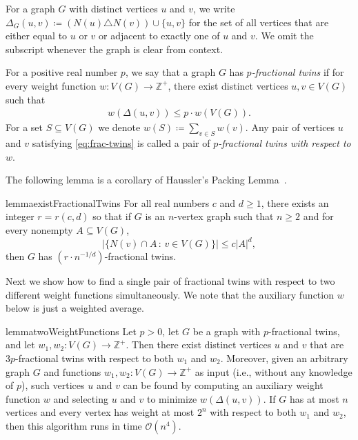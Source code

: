 \documentclass[11pt]{article}
\theoremstyle{definition}
\newcommand{\RMM}[1]{\begin{RMMin}#1\end{RMMin}}
\newcommand{\inAppendix}{$\clubsuit$}%
\renewcommand{\leq}{\leqslant}
\renewcommand{\geq}{\geqslant}
\renewcommand{\subset}{\subseteq}
\newcommand{\set}[1]{\{#1\}}
\begin{document}
For a graph $G$ with distinct vertices $u$ and $v$, we write $\Delta_G(u,v)\coloneqq (N(u)\triangle N(v))\cup\set{u,v}$ for the set of all vertices that are either equal to $u$ or $v$ or adjacent to exactly one of $u$ and $v$. 
We omit the subscript whenever the graph is clear from context.

For a positive real number $p$, we say that a graph $G$ has \emph{$p$-fractional twins} if for every weight function $w:V(G) \rightarrow \mathbb{Z}^+$, there exist distinct vertices $u,v \in V(G)$ such that \begin{align}\label{eq:frac-twins} w\left(\Delta(u,v)\right) \leq p \cdot w(V(G)).\end{align}For a set $S\subset V(G)$ we denote $w(S)\coloneqq \sum_{v \in S}w(v)$. Any  pair of vertices $u$ and $v$ satisfying \eqref{eq:frac-twins}  is called a pair of \emph{$p$-fractional twins with respect to $w$}. 

The following lemma is a corollary of Haussler's Packing Lemma~\cite{Haussler95}.

\begin{restatable}[\inAppendix{}]{lemma}{existFractionalTwins}
\label{lem:existFractionalTwins}
For all real numbers $c$ and $d\geq 1$, there exists an integer $r = r(c,d)$ so that if $G$ is an $n$-vertex graph such that $n\geq 2$ and for every nonempty $A \subseteq V(G)$,
    \[\Big|\set{N(v)\cap A\,:\,v\in V(G)}\Big| \leq c|A|^d,\]
then $G$ has $(r \cdot n^{-1/d})$-fractional twins.
\end{restatable}


Next we show how to find a single pair of fractional twins with respect to two different weight functions simultaneously. We note that the auxiliary function $w$ below is just a weighted average. 


\begin{restatable}[\inAppendix{}]{lemma}{twoWeightFunctions}
\label{lem:twoWeightFunctions}
    Let $p>0$, let $G$ be a graph with $p$-fractional twins, and let $w_1, w_2: V(G) \rightarrow \mathbb{Z}^+$. Then there exist distinct vertices $u$ and $v$ that are $3p$-fractional twins with respect to both $w_1$ and $w_2$. Moreover, given an arbitrary graph $G$ and functions $w_1,w_2: V(G) \rightarrow \mathbb{Z}^+$ as input (i.e., without any knowledge of $p$), such vertices $u$ and $v$ can be found by computing an auxiliary weight function $w$ and selecting $u$ and $v$ to minimize $w(\Delta(u,v))$. If $G$ has at most $n$ vertices and every vertex has weight at most $2^n$ with respect to both $w_1$ and $w_2$, then this algorithm runs in time $\mathcal{O}(n^4)$.
\end{restatable}
\end{document}
